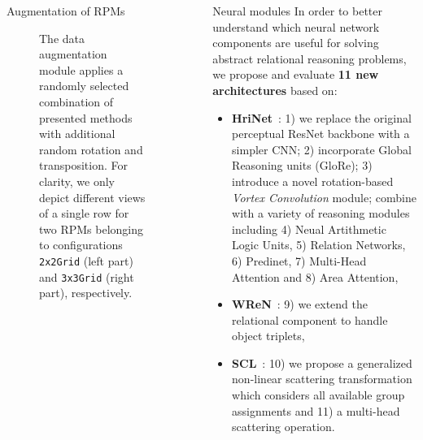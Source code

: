 \documentclass[final]{beamer}
\newlength{\sepwidth}
\newlength{\colwidth}
\newcommand{\separatorcolumn}{\begin{column}{\sepwidth}\end{column}}
\begin{document}
\begin{frame}[t]
\begin{columns}[t]
\begin{column}{\colwidth}
\begin{block}{Augmentation of RPMs}
\begin{figure}[t]
{                        The data augmentation module applies a randomly selected combination of presented methods with additional random rotation and transposition.
                        For clarity, we only depict different views of a single row for two RPMs belonging to configurations \texttt{2x2Grid} (left part) and \texttt{3x3Grid} (right part), respectively.
                        }
                        \label{fig:augmentation}
                    \end{figure}
                \end{block}

            \end{column}

            \separatorcolumn

            \begin{column}{\colwidth}

                \begin{block}{Neural modules}
                    In order to better understand which neural network components are useful for solving abstract relational reasoning problems, we propose and evaluate \textbf{11 new architectures} based on:
                    \begin{itemize}
                        \item \textbf{HriNet}~\cite{hu2020hierarchical}: 1) we replace the original perceptual ResNet backbone with a simpler CNN; 2) incorporate Global Reasoning units (GloRe); 3) introduce a novel rotation-based \textit{Vortex Convolution} module; combine with a variety of reasoning modules including 4) Neual Artithmetic Logic Units, 5) Relation Networks, 6) Predinet, 7) Multi-Head Attention and 8) Area Attention,
                        \item \textbf{WReN}~\cite{santoro2018measuring}: 9) we extend the relational component to handle object triplets,
                        \item \textbf{SCL}~\cite{wu2020scattering}: 10) we propose a generalized non-linear scattering transformation which considers all available group assignments and 11) a multi-head scattering operation.
                    \end{itemize}
                \end{block}


\end{column}
\end{columns}
\end{frame}
\end{document}
